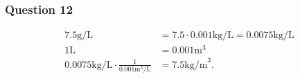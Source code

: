 \subsubsection{Question 12}

\vspace{1em}

\begin{solution}
	\begin{align*}
		7.5\text{g/L} &= 7.5 \cdot 0.001 \text{kg/L} = 0.0075 \text{kg/L} \\
		1\text{L} &= 0.001\text{m}^3 \\
		0.0075\text{kg/L} \cdot \frac{1}{0.001\text{m}^3\text{/L}} &= 7.5\text{kg/m}^3
	.\end{align*}
\end{solution}
